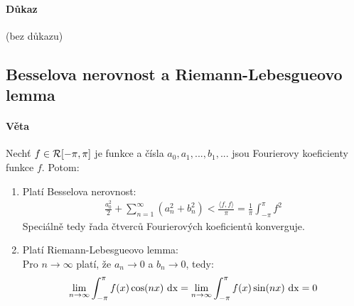 \documentclass[a4paper,10pt]{article}
\begin{document}
\paragraph{Důkaz}
(bez důkazu)





\subsection{Besselova nerovnost a Riemann-Lebesgueovo lemma}
\label{rl-lemma}
\setcounter{equation}{0}
\paragraph{Věta}
Nechť $f \in \mathcal{R}[-\pi,\pi]$ je funkce a čísla $a_0, a_1, ..., b_1, ...$ jsou
Fourierovy koeficienty funkce $f$. Potom:
\begin{enumerate}
	\item Platí Besselova nerovnost:
	\begin{align*}
		\frac{a_0^2}{2} + \sum_{n=1}^\infty (a_n^2 + b_n^2) \lt \frac{\langle f,
		f \rangle}{\pi} = \frac{1}{\pi} \int_{-\pi}^\pi f^2
	\end{align*}
	Speciálně tedy řada čtverců Fourierových koeficientů konverguje.
	\item Platí Riemann-Lebesgueovo lemma: \\
	Pro $n \to \infty$ platí, že $a_n \to 0$ a $b_n \to 0$, tedy:
	\begin{align*}
		\lim_{n\to\infty} \int_{-\pi}^\pi f(x)\cos(nx) \operatorname*{\,dx} = \lim_{n\to\infty} \int_{-\pi}^\pi f(x)\sin(nx) \operatorname*{\,dx} = 0
	\end{align*}
\end{enumerate}
\end{document}
